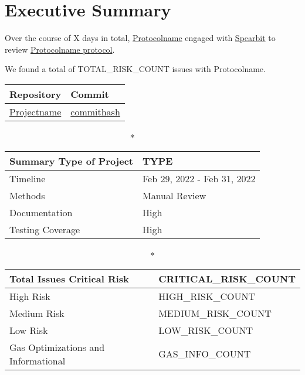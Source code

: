 \hypertarget{executive-summary}{%
\section{Executive Summary}\label{executive-summary}}

Over the course of X days in total, \href{https://protocolname.come}{Protocolname} engaged with
\href{https://spearbit.com}{Spearbit} to review
\href{https://github.com/permalink-to-protocolname}{Protocolname protocol}. 

We found a total of TOTAL_RISK_COUNT issues with Protocolname. 

\begin{longtable}[c]{|l|l|}
\hline \textbf{Repository} & \textbf{Commit} \\

\hline
\href{https://github.com/permalink}{Projectname} &
\href{https://github.com/permalink/commit/commithash}{commithash} \\
\hline
\end{longtable}

\begin{longtable}[]{|l|l|}

\caption*{\textbf{Summary}}
\hline Type of Project & TYPE \\   
\hline Timeline & Feb 29, 2022 - Feb 31, 2022   \\
\hline Methods & Manual Review \\
\hline Documentation & High \\
\hline Testing Coverage & High  \\
\hline
\end{longtable}


\begin{longtable}[]{|l|l|}
\caption*{\textbf{Total Issues}}
\hline Critical Risk & CRITICAL_RISK_COUNT \\
\hline High Risk & HIGH_RISK_COUNT \\
\hline Medium Risk & MEDIUM_RISK_COUNT \\ 
\hline Low Risk & LOW_RISK_COUNT \\
\hline Gas Optimizations and Informational & GAS_INFO_COUNT \\
\hline
\end{longtable}

